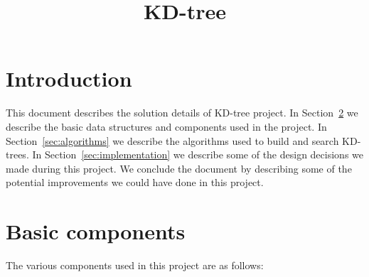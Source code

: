 \documentclass[11pt]{amsart}
\title{KD-tree}
\begin{document}
\maketitle

\section{Introduction}
This document describes the solution details of KD-tree project. In Section~\ref{sec:basic_components} we describe the basic data structures and components used in the project. In Section~\ref{sec:algorithms} we describe the algorithms used to build and search KD-trees. In Section~\ref{sec:implementation} we describe some of the design decisions we made during this project. We conclude the document by describing some of the potential improvements we could have done in this project.

\section{Basic components}
\label{sec:basic_components}

The various components used in this project are as follows:
\end{document}
